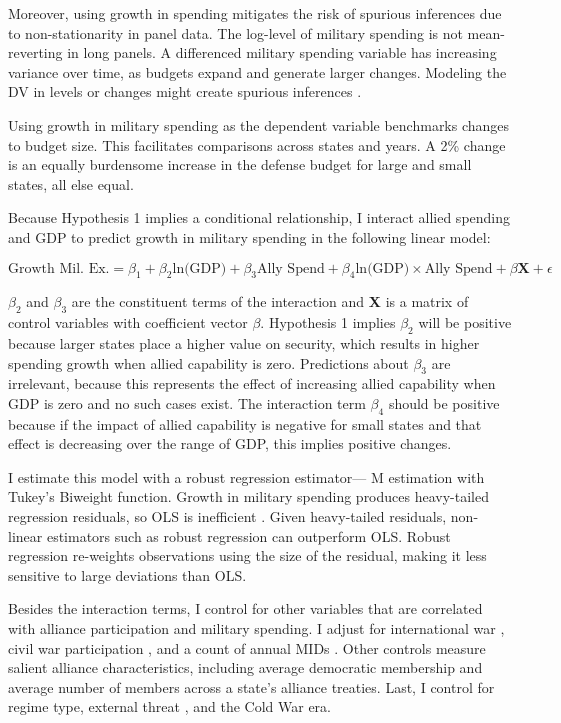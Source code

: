 \documentclass[12pt]{article}
\begin{document}
Moreover, using growth in spending mitigates the risk of spurious inferences due to non-stationarity in panel data. 
The log-level of military spending is not mean-reverting in long panels.
A differenced military spending variable has increasing variance over time, as budgets expand and generate larger changes. 
Modeling the DV in levels or changes might create spurious inferences \citep{GrangerNewbold1974}. 


Using growth in military spending as the dependent variable benchmarks changes to budget size. 
This facilitates comparisons across states and years. 
A 2\% change is an equally burdensome increase in the defense budget for large and small states, all else equal. 


Because Hypothesis 1 implies a conditional relationship, I interact allied spending and GDP to predict growth in military spending in the following linear model:

\begin{equation} 
\mbox{Growth Mil. Ex.} = \beta_1 + \beta_2 \mbox{ln(GDP)} + \beta_3 \mbox{Ally Spend} + \beta_4 \mbox{ln(GDP)} \times \mbox{Ally Spend} + \beta \mathbf{X} + \epsilon
\end{equation}


$\beta_2$ and $\beta_3$ are the constituent terms of the interaction and \textbf{X} is a matrix of control variables with coefficient vector $\beta$.
Hypothesis 1 implies $\beta_2$ will be positive because larger states place a higher value on security, which results in higher spending growth when allied capability is zero. 
Predictions about $\beta_3$ are irrelevant, because this represents the effect of increasing allied capability when GDP is zero and no such cases exist. 
The interaction term $\beta_4$ should be positive because if the impact of allied capability is negative for small states and that effect is decreasing over the range of GDP, this implies positive changes. 


I estimate this model with a robust regression estimator--- M estimation with Tukey's Biweight function. 
Growth in military spending produces heavy-tailed regression residuals, so OLS is inefficient \citep{RaineyBaissa2018}. 
Given heavy-tailed residuals, non-linear estimators such as robust regression can outperform OLS. 
Robust regression re-weights observations using the size of the residual, making it less sensitive to large deviations than OLS. 


Besides the interaction terms, I control for other variables that are correlated with alliance participation and military spending. 
I adjust for international war \citep{Reiteretal2016}, civil war participation \citep{SarkeesWayman2010}, and a count of annual MIDs \citep{Gibleretal2016}. 
Other controls measure salient alliance characteristics, including average democratic membership \citep{DigiuseppePoast2016} and average number of members across a state's alliance treaties.   
Last, I control for regime type, external threat \citep{LeedsSavun2007}, and the Cold War era. 
\end{document}
